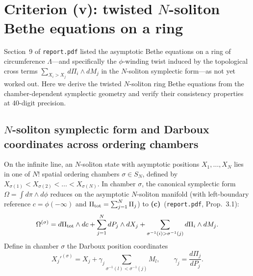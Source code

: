 \documentclass[11pt,a4paper]{article}
\newcommand{\Lc}{\textsf{\textbf{(c)}}}
\theoremstyle{remark}
\begin{document}
\section{Criterion (v): twisted \texorpdfstring{$N$}{N}-soliton Bethe equations on a ring}\label{sec:bethe}

Section~9 of \texttt{report.pdf} listed the asymptotic Bethe equations on a ring of circumference $\Lambda$---and specifically the $\phi$-winding twist induced by the topological cross terms $\sum_{X_i>X_j}d\Pi_i\wedge dM_j$ in the $N$-soliton symplectic form---as not yet worked out. Here we derive the twisted $N$-soliton ring Bethe equations from the chamber-dependent symplectic geometry and verify their consistency properties at 40-digit precision.

\subsection{\texorpdfstring{$N$}{N}-soliton symplectic form and Darboux coordinates across ordering chambers}
On the infinite line, an $N$-soliton state with asymptotic positions $X_1,\dots,X_N$ lies in one of $N!$ spatial ordering chambers $\sigma\in S_N$, defined by $X_{\sigma(1)}<X_{\sigma(2)}<\dots<X_{\sigma(N)}$. In chamber $\sigma$, the canonical symplectic form $\Omega=\int d\pi\wedge d\phi$ reduces on the asymptotic $N$-soliton manifold (with left-boundary reference $c=\phi(-\infty)$ and $\Pi_{\rm tot}=\sum_{j=1}^N\Pi_j$) to \Lc\ (\texttt{report.pdf}, Prop.~3.1):
\begin{equation}\label{eq:Omega_sigma}
\Omega^{(\sigma)}=d\Pi_{\rm tot}\wedge dc+\sum_{j=1}^N dP_j\wedge dX_j+\sum_{\sigma^{-1}(i)>\sigma^{-1}(j)} d\Pi_i\wedge dM_j.
\end{equation}
Define in chamber $\sigma$ the Darboux position coordinates
\begin{equation}\label{eq:Darboux_Xj}
X_j'^{(\sigma)}=X_j+\gamma_j\sum_{\sigma^{-1}(l)<\sigma^{-1}(j)} M_l,\qquad
\gamma_j=\frac{d\Pi_j}{dP_j}.
\end{equation}
\end{document}

